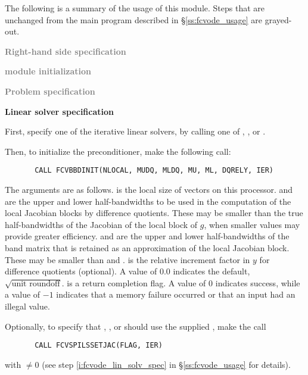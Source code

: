 The following is a summary of the usage of this module. Steps that are unchanged
from the main program described in \S\ref{ss:fcvode_usage} are grayed-out.

\begin{Steps}
  
\item \textcolor{gray}{\bf Right-hand side specification}

\item \textcolor{gray}{\bf {\nvector} module initialization}

\item \textcolor{gray}{\bf Problem specification}

\item {\bf Linear solver specification}

  First, specify one of the {\cvspils} iterative linear solvers, by calling
  one of , , or .

  Then, to initialize the {\cvbbdpre} preconditioner, make the following call:
\begin{verbatim}
       CALL FCVBBDINIT(NLOCAL, MUDQ, MLDQ, MU, ML, DQRELY, IER)
\end{verbatim}
  The arguments are as follows.
   is the local size of vectors on this processor.
   and  are the upper and lower half-bandwidths to be used in 
  the computation of the local Jacobian blocks by difference quotients.
  These may be smaller than the true half-bandwidths of the
  Jacobian of the local block of $g$, when smaller values may
  provide greater efficiency.
   and  are the upper and lower half-bandwidths of the band matrix
  that  is retained as an approximation of the local Jacobian block.
  These may be smaller than  and .
   is the relative increment factor in $y$ for difference quotients
  (optional).  A value of $0.0$ indicates the default, $\sqrt{\text{unit roundoff}}$.
   is a return completion flag.  A value of $0$ indicates success, while
  a value of $-1$ indicates that a memory failure occurred or that an input had
  an illegal value.
    
  Optionally, to specify that {\spgmr}, {\spbcg}, or {\sptfqmr} should use 
  the supplied , make the call
\begin{verbatim}
       CALL FCVSPILSSETJAC(FLAG, IER)
\end{verbatim}
  with  $\neq 0$ 
  (see step \ref{i:fcvode_lin_solv_spec} in \S\ref{ss:fcvode_usage} for details).



\end{Steps}

